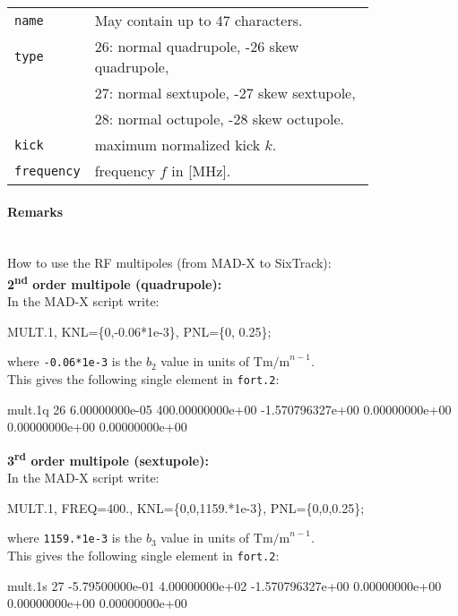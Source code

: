 \bigskip
\begin{tabular}{@{}lp{0.8\linewidth}}
    \texttt{name} & May contain up to 47 characters. \\
    \texttt{type} & 26: normal quadrupole, -26 skew quadrupole, \\
                  & 27: normal sextupole, -27 skew sextupole, \\
                  & 28: normal octupole, -28 skew octupole. \\
    \texttt{kick} & maximum normalized kick $k$. \\
    \texttt{frequency} & frequency $f$ in [MHz].
\end{tabular}

\paragraph{Remarks}~\\
How to use the RF multipoles (from MAD-X to SixTrack):\\

\noindent\textbf{2\textsuperscript{nd} order multipole (quadrupole):}\\
\noindent In the MAD-X script write:
\begin{ctverbatim}
MULT.1, KNL=\{0,-0.06*1e-3\}, PNL=\{0, 0.25\};
\end{ctverbatim}
where \texttt{-0.06*1e-3} is the $b_2$ value in units of $\mathrm{Tm/m}^{n-1}$.\\
This gives the following single element in \texttt{fort.2}:
\begin{ctverbatim}
mult.1q  26  6.00000000e-05  400.00000000e+00  -1.570796327e+00  0.00000000e+00  0.00000000e+00  0.00000000e+00
\end{ctverbatim}

\noindent\textbf{3\textsuperscript{rd} order multipole (sextupole):}\\
\noindent In the MAD-X script write:
\begin{ctverbatim}
MULT.1, FREQ=400., KNL=\{0,0,1159.*1e-3\}, PNL=\{0,0,0.25\};
\end{ctverbatim}
where \texttt{1159.*1e-3} is the $b_3$ value in units of $\mathrm{Tm/m}^{n-1}$.\\
This gives the following single element in \texttt{fort.2}:
\begin{ctverbatim}
mult.1s  27 -5.79500000e-01  4.00000000e+02  -1.570796327e+00  0.00000000e+00  0.00000000e+00  0.00000000e+00
\end{ctverbatim}

